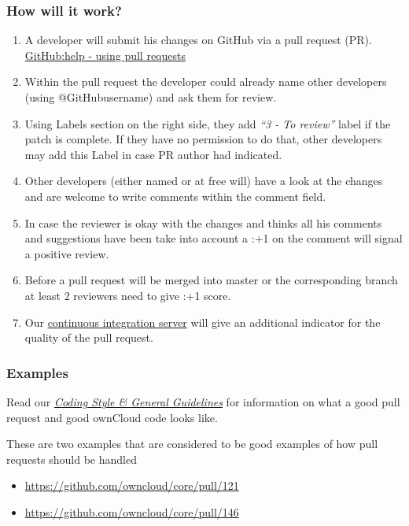 \documentclass[letterpaper,10pt,english]{sphinxmanual}
\begin{document}
\subsubsection{How will it work?}
\label{bugtracker/codereviews:how-will-it-work}\begin{enumerate}
\item {} 
A developer will submit his changes on GitHub via a pull request (PR).
\href{https://help.GitHub.com/articles/using-pull-requests}{GitHub:help - using pull requests}

\item {} 
Within the pull request the developer could already name other developers (using
@GitHubusername) and ask them for review.

\item {} 
Using Labels section on the right side, they add \emph{``3 - To review''} label if the patch is
complete. If they have no permission to do that, other developers may add this Label in case
PR author had indicated.

\item {} 
Other developers (either named or at free will) have a look at the changes
and are welcome to write comments within the comment field.

\item {} 
In case the reviewer is okay with the changes and thinks all his comments and
suggestions have been take into account a :+1 on the comment will signal a positive
review.

\item {} 
Before a pull request will be merged into master or the corresponding
branch at least 2 reviewers need to give :+1 score.

\item {} 
Our \href{https://ci.owncloud.org/}{continuous integration server} will give an additional indicator for
the quality of the pull request.

\end{enumerate}


\subsubsection{Examples}
\label{bugtracker/codereviews:examples}
Read our {\hyperref[general/codingguidelines:coding\string-style\string-guidelines\string-label]{\emph{Coding Style \& General Guidelines}}} for information on what a good pull request and
good ownCloud code looks like.

These are two examples that are considered to be good examples of how pull
requests should be handled
\begin{itemize}
\item {} 
\href{https://github.com/owncloud/core/pull/121}{https://github.com/owncloud/core/pull/121}

\item {} 
\href{https://github.com/owncloud/core/pull/146}{https://github.com/owncloud/core/pull/146}

\end{itemize}
\end{document}
